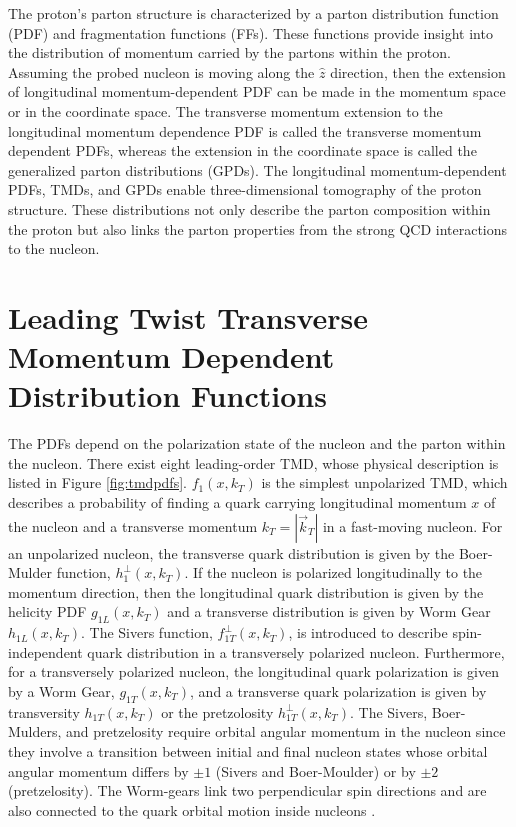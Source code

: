The proton's parton structure is characterized by a parton distribution function (PDF) and fragmentation functions (FFs). These functions provide insight into the distribution of momentum carried by the partons within the proton. Assuming the probed nucleon is moving along the $\hat{z}$ direction, then the extension of longitudinal momentum-dependent PDF can be made in the momentum space or in the coordinate space. The transverse momentum extension to the longitudinal momentum dependence PDF is called the transverse momentum dependent PDFs\cite{Collins:1981uw, Mulders:1995dh, Boer:1997nt, Bacchetta:2006tn}, whereas the extension in the coordinate space is called the generalized parton distributions (GPDs)\cite{Ji:1996ek, Muller:1994ses, Radyushkin:1997ki}. The longitudinal momentum-dependent PDFs, TMDs, and GPDs enable three-dimensional tomography of the proton structure. These distributions not only describe the parton composition within the proton but also links the parton properties from the  strong QCD interactions to the nucleon. 

\section{Leading Twist Transverse Momentum Dependent Distribution Functions}
The PDFs depend on the polarization state of the nucleon and the parton within the nucleon. There exist eight leading-order TMD, whose physical description is listed in Figure \ref{fig:tmdpdfs}. $f_1(x, k_T)$ is the simplest unpolarized TMD, which describes a probability of finding a quark carrying longitudinal momentum $x$ of the nucleon and a transverse momentum $k_T=|\vec{k}_T|$ in a fast-moving nucleon. For an unpolarized nucleon, the transverse quark distribution is given by the Boer-Mulder function, $h_{1}^\perp(x, k_T)$.  If the nucleon is polarized longitudinally to the momentum direction, then the longitudinal quark distribution is given by the helicity PDF $g_{1L}(x, k_T)$ and a transverse distribution is given by Worm Gear $h_{1L}(x, k_T)$. The Sivers function, $f_{1T}^\perp(x, k_T)$, is introduced to describe spin-independent quark distribution in a transversely polarized nucleon. Furthermore, for a transversely polarized nucleon, the longitudinal quark polarization is given by a Worm Gear, $g_{1T}(x, k_T)$, and a transverse quark polarization is given by transversity $h_{1T}(x, k_T)$ or the pretzolosity $h_{1T}^\perp(x, k_T)$. The Sivers, Boer-Mulders, and pretzelosity require orbital angular momentum in the nucleon since they involve a transition between initial and final nucleon states whose orbital angular momentum differs by $\pm 1$ (Sivers and Boer-Moulder) or by $\pm 2$ (pretzelosity). The Worm-gears link two perpendicular spin directions and are also connected to the quark orbital motion inside nucleons \cite{Aidala:2012mv}.

